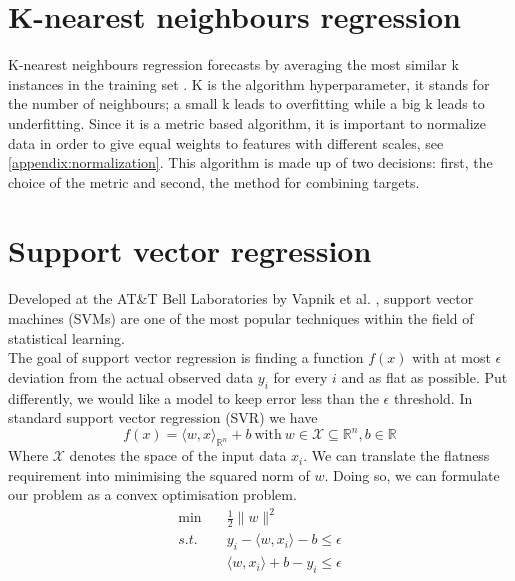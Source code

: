 \section{K-nearest neighbours regression}
K-nearest neighbours regression forecasts by averaging the most similar k instances in the training set \cite{macqueen1967some}. K is the algorithm hyperparameter, it stands for the number of neighbours; a small k leads to overfitting while a big k leads to underfitting. 
Since it is a metric based algorithm, it is important to normalize data in order to give equal weights to features with different scales, see \ref{appendix:normalization}.
This algorithm is made up of two decisions: first, the choice of the metric and second, the method for combining targets.


\section{Support vector regression}
Developed at the AT\&T Bell Laboratories by Vapnik et al. \cite{cortes1995support} \cite{vapnik1997support}, support vector machines (SVMs) are one of the most popular techniques within the field of statistical learning.
\\
The goal of support vector regression is finding a function $f(x)$ with at most $\epsilon$ deviation from the actual observed data $y_i$ for every $i$ and as flat as possible. 
Put differently, we would like a model to keep error less than the $\epsilon$ threshold.  
In standard support vector regression (SVR) we have
\begin{equation}
    f(x)=\langle w,x \rangle_{\mathbb{R}^n} +b \ \textrm{with} \ w \in \mathcal{X} \subseteq \mathbb{R}^n, b \in \mathbb{R}
\end{equation}
Where $\mathcal{X}$ denotes the space of the input data $x_i$.
We can translate the flatness requirement into minimising the squared norm of $w$. Doing so, we can formulate our problem as a convex optimisation problem.
\begin{equation}
    \begin{aligned}
        \min \quad& \frac{1}{2}\|w\|^2
        \\
        s.t. \quad& y_i-\langle w, x_i\rangle-b\leq \epsilon
        \\
        \quad& \langle w, x_i\rangle +b-y_i\leq \epsilon
    \end{aligned}
\end{equation}
